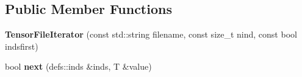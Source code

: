 \subsection*{Public Member Functions}
\begin{DoxyCompactItemize}
\item 
{\bfseries Tensor\+File\+Iterator} (const std\+::string filename, const size\+\_\+t nind, const bool indsfirst)\hypertarget{classTensorFileIterator_a5c8541d7ea6d3fca48a919f97dd8d636}{}\label{classTensorFileIterator_a5c8541d7ea6d3fca48a919f97dd8d636}

\item 
bool {\bfseries next} (defs\+::inds \&inds, T \&value)\hypertarget{classTensorFileIterator_ad623998d768fa6c788df182b2ab04b02}{}\label{classTensorFileIterator_ad623998d768fa6c788df182b2ab04b02}

\end{DoxyCompactItemize}
